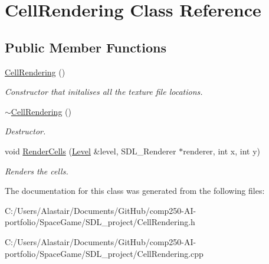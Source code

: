 \hypertarget{class_cell_rendering}{}\section{Cell\+Rendering Class Reference}
\label{class_cell_rendering}
\subsection*{Public Member Functions}
\begin{DoxyCompactItemize}
\item 
\mbox{\label{class_cell_rendering_a4dcd2917943e8c4578d364191ae9780a}} 
\hyperlink{class_cell_rendering_a4dcd2917943e8c4578d364191ae9780a}{Cell\+Rendering} ()
\begin{DoxyCompactList}\small\item\em Constructor that initalises all the texture file locations. \end{DoxyCompactList}\item 
\mbox{\label{class_cell_rendering_a2c50e18fa46fd46ff67e9dd29ec3ae22}} 
\hyperlink{class_cell_rendering_a2c50e18fa46fd46ff67e9dd29ec3ae22}{$\sim$\+Cell\+Rendering} ()
\begin{DoxyCompactList}\small\item\em Destructor. \end{DoxyCompactList}\item 
\mbox{\label{class_cell_rendering_a68566d1b9a8ec9c1ff15db22cdf05e83}} 
void \hyperlink{class_cell_rendering_a68566d1b9a8ec9c1ff15db22cdf05e83}{Render\+Cells} (\hyperlink{class_level}{Level} \&level, S\+D\+L\+\_\+\+Renderer $\ast$renderer, int x, int y)
\begin{DoxyCompactList}\small\item\em Renders the cells. \end{DoxyCompactList}\end{DoxyCompactItemize}


The documentation for this class was generated from the following files\+:\begin{DoxyCompactItemize}
\item 
C\+:/\+Users/\+Alastair/\+Documents/\+Git\+Hub/comp250-\/\+A\+I-\/portfolio/\+Space\+Game/\+S\+D\+L\+\_\+project/Cell\+Rendering.\+h\item 
C\+:/\+Users/\+Alastair/\+Documents/\+Git\+Hub/comp250-\/\+A\+I-\/portfolio/\+Space\+Game/\+S\+D\+L\+\_\+project/Cell\+Rendering.\+cpp\end{DoxyCompactItemize}
